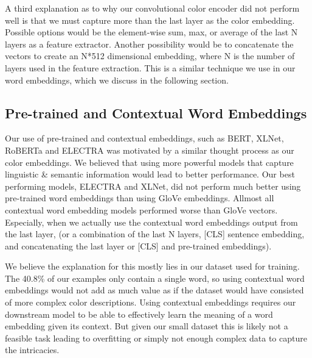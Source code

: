 \par
A third explanation as to why our convolutional color encoder did not perform well is that we must capture more than the last layer as the color embedding. Possible options would be the element-wise sum, max, or average of the last N layers as a feature extractor. Another possibility would be to concatenate the vectors to create an N*512 dimensional embedding, where N is the number of layers used in the feature extraction. This is a similar technique we use in our word embeddings, which we discuss in the following section.

\subsection{Pre-trained and Contextual Word Embeddings}

Our use of pre-trained and contextual embeddings, such as BERT, XLNet, RoBERTa and ELECTRA was motivated by a similar thought process as our color embeddings. We believed that using more powerful models that capture linguistic \& semantic information would lead to better performance. Our best performing models, ELECTRA and XLNet, did not perform much better using pre-trained word embeddings than using GloVe embeddings. Allmost all contextual word embedding models performed worse than GloVe vectors. Especially, when we actually use the contextual word embeddings output from the last layer, (or a combination of the last N layers, [CLS] sentence embedding, and concatenating the last layer or [CLS] and pre-trained embeddings).

\par
We believe the explanation for this mostly lies in our dataset used for training. The 40.8\% of our examples only contain a single word, so using contextual word embeddings would not add as much value as if the dataset would have consisted of more complex color descriptions. Using contextual embeddings requires our downstream  model to be able to effectively learn the meaning of a word embedding given its context. But given our small dataset this is likely not a feasible task leading to overfitting or simply not enough complex data to capture the intricacies.

